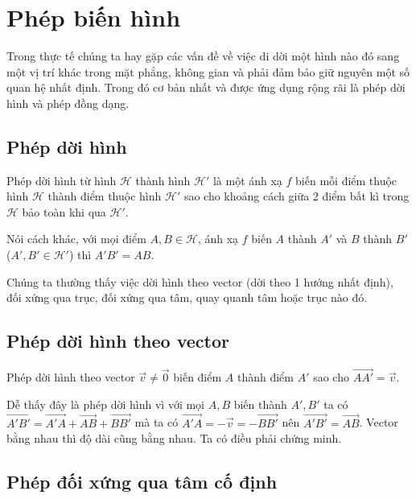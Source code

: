 \chapter{Phép biến hình}

Trong thực tế chúng ta hay gặp các vấn đề về việc di dời một hình
nào đó sang một vị trí khác trong mặt phẳng, không gian và phải đảm bảo 
giữ nguyên một số quan hệ nhất định. Trong đó cơ bản nhất và được ứng dụng 
rộng rãi là phép dời hình và phép đồng dạng.

\section{Phép dời hình}

\begin{definition}
    Phép dời hình từ hình $\mathcal{H}$ thành hình $\mathcal{H}'$ 
    là một ánh xạ $f$ biến mỗi điểm thuộc hình $\mathcal{H}$ thành điểm
    thuộc hình $\mathcal{H}'$ sao cho khoảng cách giữa 2 điểm bất
    kì trong $\mathcal{H}$ bảo toàn khi qua $\mathcal{H}'$.
\end{definition}

Nói cách khác, với mọi điểm $A, B \in \mathcal{H}$, ánh xạ $f$
biến $A$ thành $A'$ và $B$ thành $B'$ ($A', B' \in \mathcal{H}'$)
thì $A'B' = AB$.

Chúng ta thường thấy việc dời hình theo vector (dời theo 1 hướng nhất định),
đối xứng qua trục, đối xứng qua tâm, quay quanh tâm hoặc trục nào đó.

\section{Phép dời hình theo vector}

Phép dời hình theo vector $\vec{v} \neq \vec{0}$ biến
điểm $A$ thành điểm $A'$ sao cho $\overrightarrow{AA'} = \vec{v}$.

Dễ thấy đây là phép dời hình vì với mọi $A, B$ biến thành $A', B'$ ta có
$\overrightarrow{A'B'} = \overrightarrow{A'A} + \overrightarrow{AB} + \overrightarrow{BB'}$
mà ta có $\overrightarrow{A'A} = -\vec{v} = -\overrightarrow{BB'}$ nên
$\overrightarrow{A'B'} = \overrightarrow{AB}$. Vector bằng nhau thì độ dài cũng bằng nhau.
Ta có điều phải chứng minh.

\section{Phép đối xứng qua tâm cố định}

